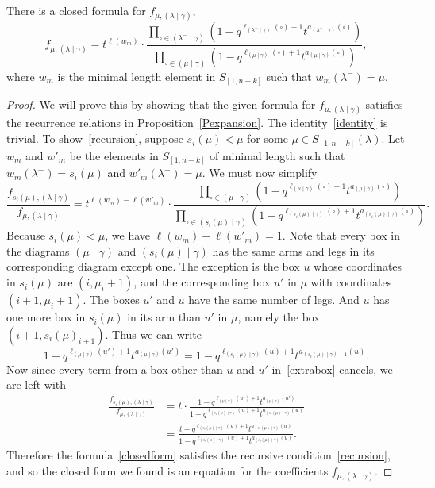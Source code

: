 \documentclass[ALCO]{cedram}
\newcommand{\nudom}{{( \lambda \mid \gamma )}}
\newcommand{\lambdagamma}{{\nudom}}
\newcommand{\mugamma}{{(\mu \mid \gamma)}}
\newcommand{\fmuu}{f_{\mu, \lambdagamma}}
\begin{document}
\begin{prop}
There is a closed formula for $\fmuu$,
\begin{equation}\label{closedform} \fmuu = t^{\ell(w_m)} \cdot \frac{\prod\limits_{\square \in (\lambda^- \mid \gamma)} \left( 1-q^{\ell_{(\lambda^- \mid \gamma)} (\square)+1} t^{a_{(\lambda^- \mid \gamma)} (\square)} \right)}{\prod\limits_{\square \in (\mu \mid \gamma)} \left( 1-q^{\ell_{(\mu \mid \gamma)} (\square)+1} t^{a_{(\mu \mid \gamma)} (\square)} \right) }, \end{equation}
where $w_m$ is the minimal length element in $S_{[1,n-k]}$ such that $w_m(\lambda^-)=\mu$.
\end{prop}
\begin{proof}
We will prove this by showing that the given formula for $\fmuu$ satisfies the recurrence relations in Proposition~\ref{Pexpansion}. The identity~\eqref{identity} is trivial. To show~\eqref{recursion}, suppose $s_i(\mu)<\mu$ for some $\mu \in S_{[1,n-k]}(\lambda)$. Let $w_m$ and $w'_m$ be the elements in $S_{[1,n-k]}$ of minimal length such that $w_m(\lambda^-)=s_i(\mu)$ and $w'_m(\lambda^-)=\mu$. We must now simplify
\begin{equation}\label{extrabox}\frac{f_{s_i(\mu),\lambdagamma}}{\fmuu} = t^{\ell(w_m)-\ell(w'_m)} \cdot \frac{\prod\limits_{\square \in (\mu \mid \gamma)} \left( 1-q^{\ell_{(\mu\mid \gamma)} (\square)+1} t^{a_{(\mu \mid \gamma)} (\square)} \right)}{\prod\limits_{\square \in (s_i(\mu) \mid \gamma)} \left( 1-q^{\ell_{(s_i(\mu) \mid \gamma)} (\square)+1} t^{a_{(s_i(\mu) \mid \gamma)} (\square)} \right) }. \end{equation}
Because $s_i(\mu)<\mu$, we have $\ell(w_m)-\ell(w'_m)=1$. Note that every box in the diagrams $\mugamma$ and $(s_i(\mu)\mid \gamma)$ has the same arms and legs in its corresponding diagram except one. The exception is the box $u$ whose coordinates in $s_i(\mu)$ are $(i,\mu_i+1)$, and the corresponding box $u'$ in $\mu$ with coordinates $(i+1,\mu_i+1)$. The boxes $u'$ and $u$ have the same number of legs. And $u$ has one more box in $s_i(\mu)$ in its arm than $u'$ in $\mu$, namely the box $(i+1,s_i(\mu)_{i+1})$. Thus we can write
\[ 1-q^{\ell_{(\mu\mid \gamma)} (u')+1} t^{a_{(\mu \mid \gamma)} (u')}=1-q^{\ell_{(s_i(\mu)\mid \gamma)} (u)+1} t^{a_{(s_i(\mu) \mid \gamma)-1} (u)}.\]
Now since every term from a box other than $u$ and $u'$ in~\eqref{extrabox} cancels, we are left with
\begin{align*} \frac{f_{s_i(\mu),\lambdagamma}}{\fmuu} &= t \cdot \frac{ 1-q^{\ell_{(\mu\mid \gamma)} (u')+1} t^{a_{(\mu \mid \gamma)} (u')}}{ 1-q^{\ell_{(s_i(\mu) \mid \gamma)} (u)+1} t^{a_{(s_i(\mu) \mid \gamma)} (u)} }\\
&= \frac{t-q^{\ell_{(s_i(\mu) \mid \gamma)} (u)+1} t^{a_{(s_i(\mu) \mid \gamma)} (u)}}{1-q^{\ell_{(s_i(\mu) \mid \gamma)} (u)+1} t^{a_{(s_i(\mu) \mid \gamma)} (u)}}.\end{align*}
Therefore the formula~\eqref{closedform} satisfies the recursive condition~\eqref{recursion}, and so the closed form we found is an equation for the coefficients $\fmuu$. \end{proof}
\end{document}
